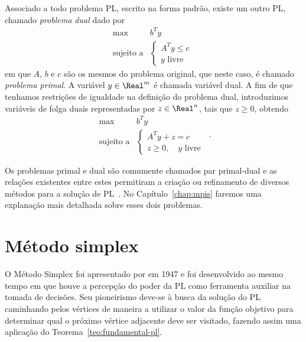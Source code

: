 Associado a todo problema \ac{PL}, escrito na forma padrão, existe um outro \ac{PL}, chamado \emph{problema dual} dado por
\begin{equation*}
\begin{array}{lc}
\displaystyle \max & b^Ty \\
\text{sujeito a} &\begin{cases} A^Ty \leq c \\
				 y \text{ livre}	
				 \end{cases}\
\end{array}
\end{equation*}
em que $A$, $b$ e $c$ são os mesmos do problema original, que neste caso, é chamado \emph{problema primal}.
A variável $y\in\Real^{m}$ é chamada variável dual. A fim de que tenhamos restrições de igualdade na definição do problema dual, introduzimos  variáveis de folga duais representadas por $z\in\Real^{n}$, tais que $z\geq 0$, obtendo 
\begin{equation}
\begin{array}{lc}
\displaystyle \max & b^Ty \\
\text{sujeito a} &\begin{cases} A^Ty +z =  c \\
				 z\geq 0, \quad y \text{ livre}	
				 \end{cases}\
\end{array}.
\label{eq:introPL-dual}
\end{equation}


Os problemas primal e dual são comumente chamados par primal-dual e as relações existentes entre estes permitiram a criação ou refinamento de diversos métodos para a solução de \ac{PL}~\cite{Bazaraa:2009uu}. No Capítulo~\ref{chap:mpis} faremos uma explanação mais detalhada sobre esses dois problemas.

\section{Método simplex}


O Método Simplex foi apresentado por
\textcite{Dantzig:Maximization-of-a-linear:1951y} em 1947 e foi desenvolvido ao
mesmo tempo em que houve a percepção do poder da \ac{PL} como ferramenta auxiliar na
tomada de decisões. Seu pioneirismo deve-se à busca da solução do \ac{PL}
caminhando pelos vértices de maneira a utilizar o valor da função objetivo para determinar qual o próximo vértice adjacente deve ser
visitado, fazendo assim uma aplicação do Teorema~\ref{teo:fundamental-pl}.

